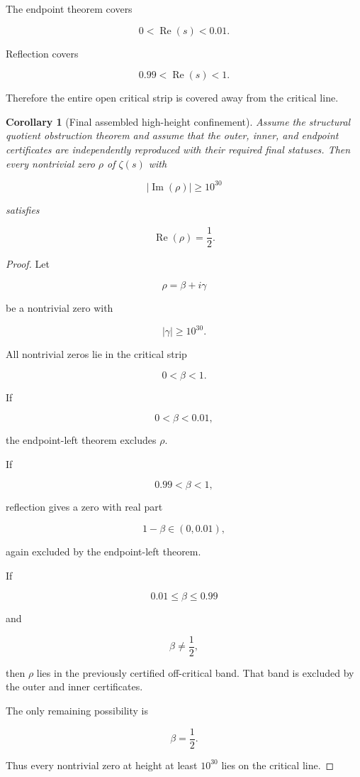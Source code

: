 \documentclass[11pt]{article}
\newtheorem{corollary}[theorem]{Corollary}
\DeclareMathOperator{\Rea}{Re}
\DeclareMathOperator{\Ima}{Im}
\begin{document}
The endpoint theorem covers

\[
0<\Rea(s)<0.01.
\]

Reflection covers

\[
0.99<\Rea(s)<1.
\]

Therefore the entire open critical strip is covered away from the critical line.

\begin{corollary}[Final assembled high-height confinement]
Assume the structural quotient obstruction theorem and assume that the outer, inner, and endpoint certificates are independently reproduced with their required final statuses.  Then every nontrivial zero \(\rho\) of \(\zeta(s)\) with

\[
|\Ima(\rho)|\geq10^{30}
\]

satisfies

\[
\Rea(\rho)=\frac12.
\]
\end{corollary}

\begin{proof}
Let

\[
\rho=\beta+i\gamma
\]

be a nontrivial zero with

\[
|\gamma|\geq10^{30}.
\]

All nontrivial zeros lie in the critical strip

\[
0<\beta<1.
\]

If

\[
0<\beta<0.01,
\]

the endpoint-left theorem excludes \(\rho\).

If

\[
0.99<\beta<1,
\]

reflection gives a zero with real part

\[
1-\beta\in(0,0.01),
\]

again excluded by the endpoint-left theorem.

If

\[
0.01\leq\beta\leq0.99
\]

and

\[
\beta\neq\frac12,
\]

then \(\rho\) lies in the previously certified off-critical band.  That band is excluded by the outer and inner certificates.

The only remaining possibility is

\[
\beta=\frac12.
\]

Thus every nontrivial zero at height at least \(10^{30}\) lies on the critical line.
\end{proof}
\end{document}
